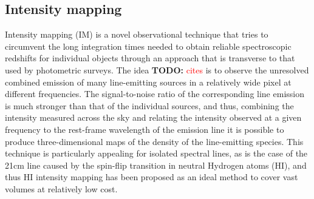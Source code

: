 \documentclass[prd,twocolumn]{revtex4}
\newcommand{\TODO}[1]{{\bf TODO:} \textcolor{red}{#1}}
\begin{document}
  \subsection{Intensity mapping}\label{ssec:method.imap}
    \begin{table}
      \caption{Experimental specifications assumed for SKA, MeerKAT and HIRAX. The baseline
               distributions for each experiment are described in Sections
               \ref{sssec:method.imap.ska} and \ref{sssec:method.imap.hirax}.}
      \label{tab:im_exp}
    \end{table}
    Intensity mapping (IM) is a novel observational technique that tries to circumvent the
    long integration times needed to obtain reliable spectroscopic redshifts for individual
    objects through an approach that is transverse to that used by photometric surveys.
    The idea \TODO{cites} is to observe the unresolved combined emission of many line-emitting
    sources in a relatively wide pixel at different frequencies. The signal-to-noise ratio
    of the corresponding line emission is much stronger than that of the individual sources,
    and thus, combining the intensity measured across the sky and relating the intensity
    observed at a given frequency to the rest-frame wavelength of the emission line it is
    possible to produce three-dimensional maps of the density of the line-emitting species.
    This technique is particularly appealing for isolated spectral lines, as is the case
    of the 21cm line caused by the spin-flip transition in neutral Hydrogen atoms (HI),
    and thus HI intensity mapping has been proposed as an ideal method to cover vast
    volumes at relatively low cost.
    
\end{document}
